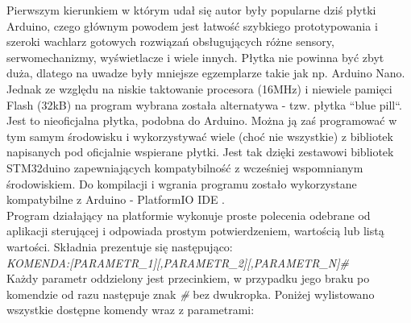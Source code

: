 Pierwszym kierunkiem w którym udał się autor były popularne dziś płytki Arduino, czego głównym powodem jest łatwość szybkiego prototypowania i szeroki wachlarz gotowych rozwiązań obsługujących różne sensory, serwomechanizmy, wyświetlacze i wiele innych. Płytka nie powinna być zbyt duża, dlatego na uwadze były mniejsze egzemplarze takie jak np. Arduino Nano. Jednak ze względu na niskie taktowanie procesora (16MHz) i niewiele pamięci Flash (32kB) na program wybrana została alternatywa - tzw. płytka ``blue pill``\cite{bluepill}. Jest to nieoficjalna płytka, podobna do Arduino. Można ją zaś programować w tym samym środowisku i wykorzystywać wiele (choć nie wszystkie) z bibliotek napisanych pod oficjalnie wspierane płytki. Jest tak dzięki zestawowi bibliotek STM32duino \cite{stm32duino-github} zapewniających kompatybilność z wcześniej wspomnianym środowiskiem. Do kompilacji i wgrania programu zostało wykorzystane kompatybilne z Arduino - PlatformIO IDE \cite{platformio}.
\\

Program działający na platformie wykonuje proste polecenia odebrane od aplikacji sterującej i odpowiada prostym potwierdzeniem, wartością lub listą wartości. 
Składnia prezentuje się następująco: \\

\emph{KOMENDA:[PARAMETR\_1][,PARAMETR\_2][,PARAMETR\_N]#}\\

Każdy parametr oddzielony jest przecinkiem, w przypadku jego braku po komendzie od razu następuje znak \emph{#} bez dwukropka.
Poniżej wylistowano wszystkie dostępne komendy wraz z parametrami:

